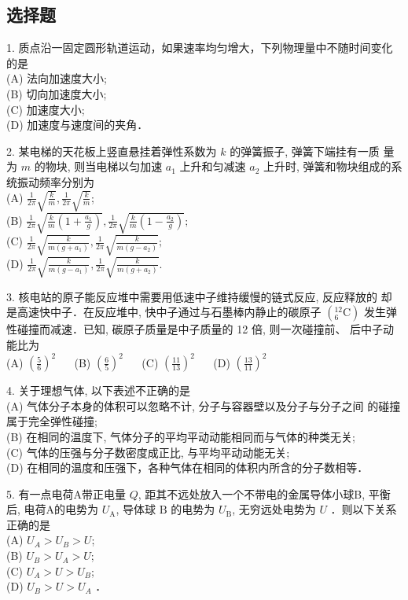 \subsection{选择题}
1. 质点沿一固定圆形轨道运动，如果速率均匀增大，下列物理量中不随时间变化的是\\
(A) 法向加速度大小;\\
(B) 切向加速度大小;\\
(C) 加速度大小;\\
(D) 加速度与速度间的夹角．

2. 某电梯的天花板上竖直悬挂着弹性系数为 $k$ 的弹簧振子, 弹簧下端挂有一质 量为 $m$ 的物块, 则当电梯以匀加速 $a_{1}$ 上升和匀减速 $a_{2}$ 上升时, 弹簧和物块组成的系统振动频率分别为\\
(A) $\frac{1}{2 \pi} \sqrt{\frac{k}{m}},\frac{1}{2 \pi} \sqrt{\frac{k}{m}}$;\\
(B) $\frac{1}{2 \pi} \sqrt{\frac{k}{m}\left(1+\frac{a_{1}}{g}\right)},\frac{1}{2 \pi} \sqrt{\frac{k}{m}\left(1-\frac{a_{2}}{g}\right)} ;$\\
(C) $\frac{1}{2 \pi} \sqrt{\frac{k}{m\left(g+a_{1}\right)}},\frac{1}{2 \pi} \sqrt{\frac{k}{m\left(g-a_{2}\right)}} ;$\\
(D) $\frac{1}{2 \pi} \sqrt{\frac{k}{m\left(g-a_{1}\right)}},\frac{1}{2 \pi} \sqrt{\frac{k}{m\left(g+a_{2}\right)}} .$

3. 核电站的原子能反应堆中需要用低速中子维持缓慢的链式反应, 反应释放的 却是高速快中子．在反应堆中, 快中子通过与石墨棒内静止的碳原子 $\left({ }_{6}^{12} \mathrm{C}\right)$ 发生弹性碰撞而减速．已知, 碳原子质量是中子质量的 12 倍, 则一次碰撞前、 后中子动能比为\\
(A) $\left(\frac{5}{6}\right)^{2}$ $\quad$
(B) $\left(\frac{6}{5}\right)^{2}$ $\quad$
(C) $\left(\frac{11}{13}\right)^{2}$ $\quad$
(D) $\left(\frac{13}{11}\right)^{2}$ 

4. 关于理想气体, 以下表述不正确的是\\
(A) 气体分子本身的体积可以忽略不计, 分子与容器壁以及分子与分子之间 的碰撞属于完全弹性碰撞;\\
(B) 在相同的温度下, 气体分子的平均平动动能相同而与气体的种类无关;\\
(C) 气体的压强与分子数密度成正比, 与平均平动动能无关;\\
(D) 在相同的温度和压强下，各种气体在相同的体积内所含的分子数相等．

5. 有一点电荷A带正电量 $Q$, 距其不远处放入一个不带电的金属导体小球B, 平衡后, 电荷A的电势为 $U_{\mathrm{A}}$, 导体球 $\mathrm{B}$ 的电势为 $U_{\mathrm{B}}$, 无穷远处电势为 $U$ ．则以下关系正确的是\\
(A) $U_{A}>U_{B}>U$;\\
(B) $U_{B}>U_{A}>U$;\\
(C) $U_{A}>U>U_{B}$;\\
(D) $U_{B}>U>U_{A}$ ．

